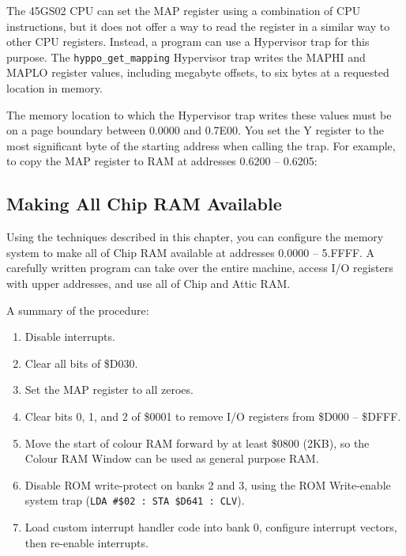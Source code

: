 The 45GS02 CPU can set the MAP register using a combination of CPU instructions, but it does not offer a way to read the register in a similar way to other CPU registers. Instead, a program can use a Hypervisor trap for this purpose. The {\tt hyppo\_get\_mapping} Hypervisor trap writes the MAPHI and MAPLO register values, including megabyte offsets, to six bytes at a requested location in memory.

The memory location to which the Hypervisor trap writes these values must be on a page boundary between 0.0000 and 0.7E00. You set the Y register to the most significant byte of the starting address when calling the trap. For example, to copy the MAP register to RAM at addresses 0.6200 -- 0.6205:


\subsection{Making All Chip RAM Available}

Using the techniques described in this chapter, you can configure the memory system to make all of Chip RAM available at addresses 0.0000 -- 5.FFFF. A carefully written program can take over the entire machine, access I/O registers with upper addresses, and use all of Chip and Attic RAM.

A summary of the procedure:

\begin{enumerate}
\item Disable interrupts.
\item Clear all bits of \$D030.
\item Set the MAP register to all zeroes.
\item Clear bits 0, 1, and 2 of \$0001 to remove I/O registers from \$D000 -- \$DFFF.
\item Move the start of colour RAM forward by at least \$0800 (2KB), so the Colour RAM Window can be used as general purpose RAM.
\item Disable ROM write-protect on banks 2 and 3, using the ROM Write-enable system trap ({\tt LDA \#\$02 : STA \$D641 : CLV}).
\item Load custom interrupt handler code into bank 0, configure interrupt vectors, then re-enable interrupts.
\end{enumerate}

